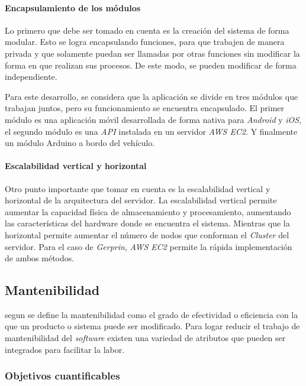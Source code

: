 \paragraph{Encapsulamiento de los módulos\\}

Lo primero que debe ser tomado en cuenta es la creación del sistema de forma modular. Esto se logra encapsulando funciones, para que trabajen de manera privada y que solamente puedan ser llamadas por otras funciones sin modificar la forma en que realizan sus procesos. De este modo, se pueden modificar de forma independiente. 

Para este desarrollo, se considera que la aplicación se divide en tres módulos que trabajan juntos, pero su funcionamiento se encuentra encapsulado. El primer módulo es una aplicación móvil desarrollada de forma nativa para \textit{Android} y \textit{iOS}, el segundo módulo es una \textit{API} instalada en un servidor \textit{AWS EC2}. Y finalmente un módulo Arduino a bordo del vehículo. 

\paragraph{Escalabilidad vertical y horizontal\\}

Otro punto importante que tomar en cuenta es la escalabilidad vertical y horizontal de la arquitectura del servidor. La escalabilidad vertical permite aumentar la capacidad física de almacenamiento y procesamiento, aumentando las características del hardware donde se encuentra el sistema. Mientras que la horizontal permite aumentar el número de nodos que conforman el \textit{Cluster} del servidor. Para el caso de \textit{Gerprin}, \textit{AWS EC2} permite la rápida implementación de ambos métodos.

\subsection{Mantenibilidad}

segun \citet{pdf04} se define la mantenibilidad como el grado de efectividad o eficiencia con la que un producto o sistema puede ser modificado. Para logar reducir el trabajo de mantenibilidad del \textit{software} existen una variedad de atributos que pueden ser integrados para facilitar la labor. 

\subsubsection{Objetivos cuantificables}

